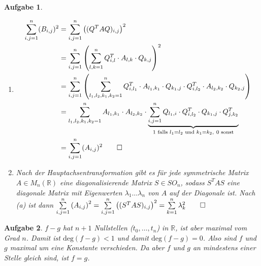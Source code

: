 \documentclass[11pt]{article}
\theoremstyle{break}
\newtheorem{task}{Aufgabe}
\def\R{\ensuremath{\mathbb{R}}}
\begin{document}
\begin{task}
    \hfill\vspace{-5mm}
    \begin{enumerate}[label={(\alph*)}]
        \item \begin{align*}
            \sum\limits_{i,j=1}^{n} (B_{i,j})^2 &=\sum\limits_{i,j=1}^{n} \left((Q^T A Q)_{i,j}\right)^2\\
            &=\sum\limits_{i,j=1}^{n} \left(\sum\limits_{l,k=1}^{n} Q^T_{i,l}\cdot A_{l,k}\cdot Q_{k,j}\right)^2\\
            &=\sum\limits_{i,j=1}^{n}\left(\sum\limits_{l_1,l_2,k_1,k_2=1}^{n} Q^T_{i,l_1}\cdot A_{l_1,k_1}\cdot Q_{k_1,j}\cdot Q^T_{i,l_2}\cdot A_{l_2,k_2}\cdot Q_{k_2,j}\right)\\
            &=\sum\limits_{l_1,l_2,k_1,k_2=1}^{n} A_{l_1,k_1}\cdot A_{l_2,k_2}\cdot \underbrace{\sum\limits_{i,j=1}^{n} Q_{l_1,i}\cdot Q^T_{i,l_2}\cdot Q_{k_1,j}\cdot Q^T_{j,k_2}}_{1\text{ falls } l_1=l_2\text{ und } k_1=k_2,\ 0\text{ sonst}}\\
            &=\sum\limits_{i,j=1}^{n} (A_{i,j})^2\qed
        \end{align*}
        \item Nach der Hauptachsentransformation gibt es für jede symmetrische Matrix $A\in M_n(\R)$ eine diagonalisierende Matrix $S\in SO_n$, sodass $S^T A S$ eine diagonale Matrix mit Eigenwerten $\lambda_1\ldots\lambda_n$ von $A$ auf der Diagonale ist. Nach (a) ist dann $\sum\limits_{i,j=1}^n \left(A_{i,j}\right)^2 = \sum\limits_{i,j=1}^n \left((S^T A S)_{i,j}\right)^2 = \sum\limits_{k=1}^n \lambda_{k}^2\qed$
    \end{enumerate}
\end{task}
\begin{task}
    $f-g$ hat $n+1$ Nullstellen ($t_0,\dots,t_n$) in $\R$, ist aber maximal vom Grad $n$. Damit ist $\mathrm{deg}(f-g) < 1$ und damit $\mathrm{deg}(f-g) = 0$. Also sind $f$ und $g$ maximal um eine Konstante verschieden. Da aber $f$ und $g$ an mindestens einer Stelle gleich sind, ist $f=g$.
\end{task}
\end{document}
